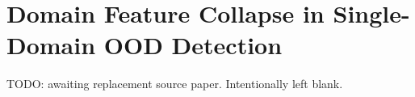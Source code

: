 \chapter{Domain Feature Collapse in Single-Domain OOD Detection}
\label{ch:domain-feature-collapse}

TODO: awaiting replacement source paper. Intentionally left blank.
